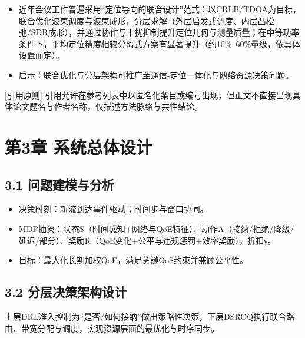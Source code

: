 \begin{itemize}
\tightlist
\item
  近年会议工作普遍采用``定位导向的联合设计''范式：以CRLB/TDOA为目标，联合优化波束调度与波束成形，分层求解（外层启发式调度、内层凸松弛/SDR成形），并通过协作与干扰抑制提升定位几何与测量质量；在中等功率条件下，平均定位精度相较分离式方案有显著提升（约10\%--60\%量级，依具体设置而定）。
\item
  启示：联合优化与分层架构可推广至通信-定位一体化与网络资源决策问题。
\end{itemize}

{[}引用原则{]}
引用允许在参考列表中以匿名化条目或编号出现，但正文不直接出现具体论文题名与作者名称，仅描述方法脉络与共性结论。

\section{第3章
系统总体设计}\label{ux7b2c3ux7ae0-ux7cfbux7edfux603bux4f53ux8bbeux8ba1}

\subsection{3.1
问题建模与分析}\label{ux95eeux9898ux5efaux6a21ux4e0eux5206ux6790}

\begin{itemize}
\tightlist
\item
  决策时刻：新流到达事件驱动；时间步与窗口协同。
\item
  MDP抽象：状态S（时间感知+网络与QoE特征）、动作A（接纳/拒绝/降级/延迟/部分）、奖励R（QoE变化+公平与违规惩罚+效率奖励），折扣γ。
\item
  目标：最大化长期加权QoE，满足关键QoS约束并兼顾公平性。
\end{itemize}

\subsection{3.2
分层决策架构设计}\label{ux5206ux5c42ux51b3ux7b56ux67b6ux6784ux8bbeux8ba1}

上层DRL准入控制为``是否/如何接纳''做出策略性决策，下层DSROQ执行联合路由、带宽分配与调度，实现资源层面的最优化与时序同步。

\begin{Shaded}
\begin{Highlighting}[]
\end{Highlighting}
\end{Shaded}

